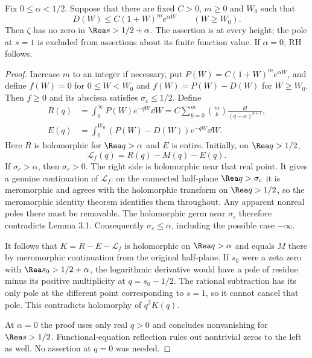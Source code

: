 \begin{theorem}\label{thm:landau}
Fix $0\le\alpha<1/2$. Suppose that there are fixed $C>0$, $m\ge0$ and $W_0$ such that
\begin{equation}\label{eq:Dbound}
D(W)\le C(1+W)^m e^{\alpha W}\qquad(W\ge W_0).
\end{equation}
Then $\zeta$ has no zero in $\Rea s>1/2+\alpha$. The assertion is at every height; the pole at $s=1$ is excluded from assertions about its finite function value. If $\alpha=0$, RH follows.
\end{theorem}
\begin{proof}
Increase $m$ to an integer if necessary, put $P(W)=C(1+W)^me^{\alpha W}$, and define $f(W)=0$ for $0\le W<W_0$ and $f(W)=P(W)-D(W)$ for $W\ge W_0$. Then $f\ge0$ and its abscissa satisfies $\sigma_c\le1/2$. Define
\begin{align*}
R(q)&=\int_0^\infty P(W)e^{-qW}\dd W=C\sum_{k=0}^m\binom mk\frac{k!}{(q-\alpha)^{k+1}},\\
E(q)&=\int_0^{W_0}(P(W)-D(W))e^{-qW}\dd W.
\end{align*}
Here $R$ is holomorphic for $\Rea q>\alpha$ and $E$ is entire. Initially, on $\Rea q>1/2$,
\begin{equation}\label{eq:Lf}
\mathcal L_f(q)=R(q)-M(q)-E(q).
\end{equation}
If $\sigma_c>\alpha$, then $\sigma_c>0$. The right side is holomorphic near that real point. It gives a genuine continuation of $\mathcal L_f$: on the connected half-plane $\Rea q>\sigma_c$ it is meromorphic and agrees with the holomorphic transform on $\Rea q>1/2$, so the meromorphic identity theorem identifies them throughout. Any apparent nonreal poles there must be removable. The holomorphic germ near $\sigma_c$ therefore contradicts Lemma 3.1. Consequently $\sigma_c\le\alpha$, including the possible case $-\infty$.

It follows that $K=R-E-\mathcal L_f$ is holomorphic on $\Rea q>\alpha$ and equals $M$ there by meromorphic continuation from the original half-plane. If $s_0$ were a zeta zero with $\Rea s_0>1/2+\alpha$, the logarithmic derivative would have a pole of residue minus its positive multiplicity at $q=s_0-1/2$. The rational subtraction has its only pole at the different point corresponding to $s=1$, so it cannot cancel that pole. This contradicts holomorphy of $q^2K(q)$.

At $\alpha=0$ the proof uses only real $q>0$ and concludes nonvanishing for $\Rea s>1/2$. Functional-equation reflection rules out nontrivial zeros to the left as well. No assertion at $q=0$ was needed.
\end{proof}

